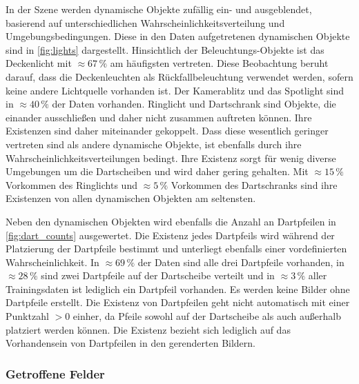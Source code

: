 In der Szene werden dynamische Objekte zufällig ein- und ausgeblendet, basierend auf unterschiedlichen Wahrscheinlichkeitsverteilung und Umgebungsbedingungen. Diese in den Daten aufgetretenen dynamischen Objekte sind in \autoref{fig:lights} dargestellt. Hinsichtlich der Beleuchtungs-Objekte ist das Deckenlicht mit $\approx67\,\%$ am häufigsten vertreten. Diese Beobachtung beruht darauf, dass die Deckenleuchten als Rückfallbeleuchtung verwendet werden, sofern keine andere Lichtquelle vorhanden ist. Der Kamerablitz und das Spotlight sind in $\approx40\,\%$ der Daten vorhanden. Ringlicht und Dartschrank sind Objekte, die einander ausschließen und daher nicht zusammen auftreten können. Ihre Existenzen sind daher miteinander gekoppelt. Dass diese wesentlich geringer vertreten sind als andere dynamische Objekte, ist ebenfalls durch ihre Wahrscheinlichkeitsverteilungen bedingt. Ihre Existenz sorgt für wenig diverse Umgebungen um die Dartscheiben und wird daher gering gehalten. Mit $\approx15\,\%$ Vorkommen des Ringlichts und $\approx5\,\%$ Vorkommen des Dartschranks sind ihre Existenzen von allen dynamischen Objekten am seltensten.

Neben den dynamischen Objekten wird ebenfalls die Anzahl an Dartpfeilen in \autoref{fig:dart_counts} ausgewertet. Die Existenz jedes Dartpfeils wird während der Platzierung der Dartpfeile bestimmt und unterliegt ebenfalls einer vordefinierten Wahrscheinlichkeit. In $\approx69\,\%$ der Daten sind alle drei Dartpfeile vorhanden, in $\approx28\,\%$ sind zwei Dartpfeile auf der Dartscheibe verteilt und in $\approx3\,\%$ aller Trainingsdaten ist lediglich ein Dartpfeil vorhanden. Es werden keine Bilder ohne Dartpfeile erstellt. Die Existenz von Dartpfeilen geht nicht automatisch mit einer Punktzahl $>0$ einher, da Pfeile sowohl auf der Dartscheibe als auch außerhalb platziert werden können. Die Existenz bezieht sich lediglich auf das Vorhandensein von Dartpfeilen in den gerenderten Bildern.

\subsubsection{Getroffene Felder}
\label{sec:felder_ergebnisse}


